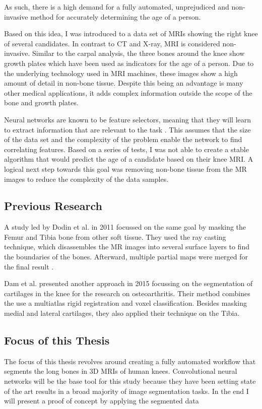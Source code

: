 As such, there is a high demand for a fully automated, unprejudiced and non-invasive method for accurately determining the age of a person.

Based on this idea, I was introduced to a data set of MRIs showing the right knee of several candidates. In contrast to CT and X-ray, MRI is considered non-invasive. Similar to the carpal analysis, the three bones around the knee show growth plates which have been used as indicators for the age of a person. Due to the underlying technology used in MRI machines, these images show a high amount of detail in non-bone tissue. Despite this being an advantage is many other medical applications, it adds complex information outside the scope of the bone and growth plates.

Neural networks are known to be feature selectors, meaning that they will learn to extract information that are relevant to the task \cite{Setiono1997}. This assumes that the size of the data set and the complexity of the problem enable the network to find correlating features. Based on a series of tests, I was not able to create a stable algorithm that would predict the age of a candidate based on their knee MRI. A logical next step towards this goal was removing non-bone tissue from the MR images to reduce the complexity of the data samples.

\subsection{Previous Research}

A study led by Dodin et al. in 2011 focussed on the same goal by masking the Femur and Tibia bone from other soft tissue. They used the ray casting technique, which disassembles the MR images into several surface layers to find the boundaries of the bones. Afterward, multiple partial maps were merged for the final result \cite{Dodin2011}.

Dam et al. presented another approach in 2015 focussing on the segmentation of cartilages in the knee for the research on osteoarthritis. Their method combines the use a multiatlas rigid registration and voxel classification. Besides masking medial and lateral cartilages, they also applied their technique on the Tibia.

\subsection{Focus of this Thesis}

The focus of this thesis revolves around creating a fully automated workflow that segments the long bones in 3D MRIs of human knees. Convolutional neural networks will be the base tool for this study because they have been setting state of the art results in a broad majority of image segmentation tasks. In the end I will present a proof of concept by applying the segmented data 

